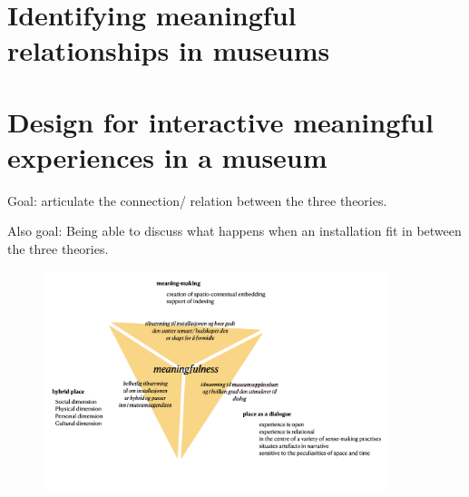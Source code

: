 \section{Identifying meaningful relationships in museums}
\section{Design for interactive meaningful experiences in a museum}

Goal: articulate the connection/ relation between the three theories.

Also goal: Being able to discuss what happens when an installation fit in between the three theories.

\begin{figure}[h]
\includegraphics[width=10cm]{pictures/meaningfullness_triangle.png}
\centering 
\end{figure}



